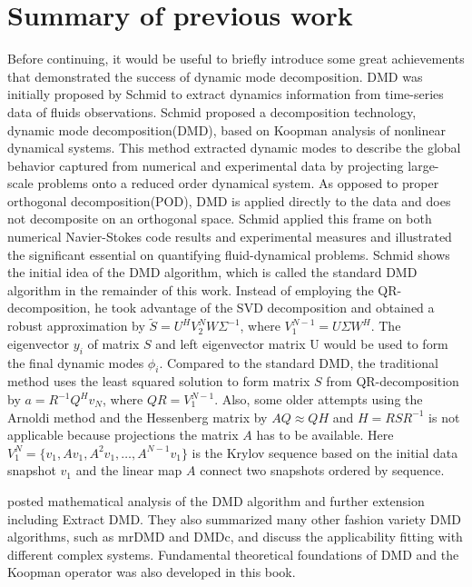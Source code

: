 \section{Summary of previous work}
Before continuing, it would be useful to briefly introduce some great achievements that demonstrated the success of dynamic mode decomposition.
DMD was initially proposed by Schmid to extract dynamics information from time-series data of fluids observations.\cite{schmid_dynamic_2010}\cite{schmid_applications_2011}
Schmid proposed a decomposition technology, dynamic mode decomposition(DMD), based on Koopman analysis of nonlinear dynamical systems. 
This method extracted dynamic modes to describe the global behavior captured from numerical and experimental data by projecting large-scale problems onto a reduced order dynamical system. 
As opposed to proper orthogonal decomposition(POD), DMD is applied directly to the data and does not decomposite on an orthogonal space. 
Schmid applied this frame on both numerical Navier-Stokes code results and experimental measures and illustrated the significant essential on quantifying fluid-dynamical problems.
Schmid shows the initial idea of the DMD algorithm, which is called the standard DMD algorithm in the remainder of this work. 
Instead of employing the QR-decomposition, he took advantage of the SVD decomposition and obtained a robust approximation by $\tilde{S} = U^HV_2^NW\Sigma^{-1}$, where $V^{N-1}_1 = U\Sigma W^H$. 
The eigenvector $y_i$ of matrix $S$ and left eigenvector matrix U would be used to form the final dynamic modes $\phi_i$.
Compared to the standard DMD, the traditional method uses the least squared solution to form matrix $S$ from QR-decomposition by $a = R^{−1}Q^Hv_N$, where $QR = V^{N-1}_1$. 
Also, some older attempts using the Arnoldi method and the Hessenberg matrix by $AQ \approx QH$ and $H = RSR^{−1}$ is not applicable because projections the matrix $A$ has to be available. 
Here $V^{N}_1 = \{v_1,Av_1,A^2v_1,…,A^{N-1}v_1 \} $ is the Krylov sequence based on the initial data snapshot $v_1$ and the linear map $A$ connect two snapshots ordered by sequence.  

\citet{tu_dynamic_2014} posted mathematical analysis of the DMD algorithm and further extension including Extract DMD.  
They also summarized many other fashion variety DMD algorithms, such as mrDMD and DMDc, and discuss the applicability fitting with different complex systems.\cite{kutz_dynamic_2016}
Fundamental theoretical foundations of DMD and the Koopman operator was also developed in this book.

